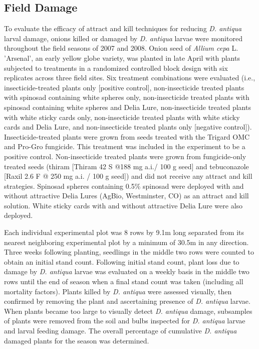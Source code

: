 \documentclass[alpha-refs]{wiley-article}
\begin{document}
\subsection{Field Damage}

To evaluate the efficacy of attract and kill techniques for reducing \textit{D. antiqua} larval damage, onions killed or damaged by \textit{D. antiqua} larvae were monitored throughout the field seasons of 2007 and 2008. Onion seed of \textit{Allium cepa} L. ’Arsenal’, an early yellow globe variety, was planted in late April with plants subjected to treatments in a randomized controlled block design with six replicates across three field sites.  Six treatment combinations were evaluated (i.e., insecticide-treated plants only [positive control], non-insecticide treated plants with spinosad containing white spheres only, non-insecticide treated plants with spinosad containing white spheres and Delia Lure, non-insecticide treated plants with white sticky cards only, non-insecticide treated plants with white sticky cards and Delia Lure, and non-insecticide treated plants only [negative control]).  Insecticide-treated plants were grown from seeds treated with the Trigard OMC and Pro-Gro fungicide.  This treatment was included in the experiment to be a positive control. Non-insecticide treated plants were grown from fungicide-only treated seeds (thiram [Thiram 42 S {@}188 mg a.i./ 100 g seed] and tebuconazole [Raxil 2.6 F @ 250 mg a.i. / 100 g seed]) and did not receive any attract and kill strategies. Spinosad spheres containing 0.5\% spinosad were deployed with and without attractive Delia Lures (AgBio, Westminster, CO) as an attract and kill solution. White sticky cards with and without attractive Delia Lure were also deployed. 

Each individual experimental plot was 8 rows by 9.1m  long separated from its nearest neighboring experimental plot by a minimum of 30.5m in any direction. Three weeks following planting, seedlings in the middle two rows were counted to obtain an initial stand count. Following initial stand count, plant loss due to damage by \textit{D. antiqua} larvae was evaluated on a weekly basis in the middle two rows until the end of season when a final stand count was taken (including all mortality factors). Plants killed by \textit{D. antiqua} were assessed visually, then confirmed by removing the plant and ascertaining presence of \textit{D. antiqua} larvae. When plants became too large to visually detect \textit{D. antiqua} damage, subsamples of plants were removed from the soil and bulbs inspected for \textit{D. antiqua} larvae and larval feeding damage. The overall percentage of cumulative \textit{D. antiqua} damaged plants for the season was determined. 
\end{document}
